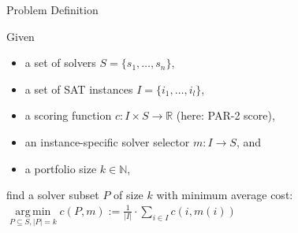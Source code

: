 \documentclass[en]{sdqbeamer}
\DeclareMathOperator*{\argmin}{arg\,min}
\begin{document}

\begin{frame}[t]{Problem Definition}
	\begin{definition}
		\setlength{\leftmargini}{0.4cm} %
		\pause
		Given
		\begin{itemize}
			\itemsep0em
			\item a set of solvers $S = \{s_1, \dots, s_n\}$,
			\pause
			\item a set of SAT instances $I = \{i_1, \dots, i_l\}$,
			\pause
			\item a scoring function $c: I \times S \rightarrow \mathbb{R}$ (here: PAR-2 score),
			\pause
			\item an instance-specific solver selector $m: I \rightarrow S$, and
			\pause
			\item a portfolio size $k \in \mathbb{N}$,
			\pause
		\end{itemize}
		find a solver subset $P$ of size $k$ with minimum average cost: $\argmin\limits_{P \subseteq S, |P| = k} c(P,m) := \frac{1}{|I|} \cdot \sum\limits_{i \in I}{c(i,m(i))}$

\end{definition}
\end{frame}
\end{document}
